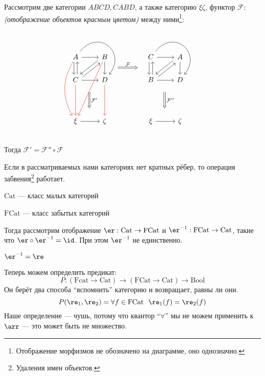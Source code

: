 \begin{example}
    Рассмотрим две категории \(ABCD, CABD\), а также категорию \(\xi\zeta\), функтор \(\mathcal{F} : \) \textit{(отображение объектов красным цветом)} между ними\footnote{Отображение морфизмов не обозначено на диаграмме, оно однозначно.}:
    \[\begin{tikzcd}
            A \arrow[red, bend right]{ddd} \arrow{r}\arrow[shift right]{d}\arrow[bend left = 90, looseness = 2]{rd} & B \arrow[red]{dddl}\arrow[shift right]{dl}\arrow{d} \arrow[Rightarrow, shift right = 6, shorten <= 1em, shorten >= 1em]{rr}{\mathcal{F}} & & C \arrow{r}\arrow[shift right]{d}\arrow[bend left = 90, looseness = 2]{rd} & A \arrow[shift right]{dl}\arrow{d} \\
            C \arrow[red]{dd}\arrow[shift right]{u}\arrow[shift right]{ur} \arrow{r} \arrow[Rightarrow, shift left = 8, shorten <= 1em, shorten >= 1em]{dd}{\mathcal{F}'} & D \arrow[red]{dd} & & B \arrow[shift right]{u}\arrow[shift right]{ur} \arrow{r} \arrow[Rightarrow, shift left = 8, shorten <= 1em, shorten >= 1em]{dd}{\mathcal{F}''} & D  \\
            {} & {} \\
            \xi \arrow{r} & \zeta & & \xi \arrow{r} & \zeta \\
        \end{tikzcd}\]
    Тогда \(\mathcal{F}' = \mathcal{F}'' \circ \mathcal{F}\)
\end{example}

Если в рассматриваемых нами категориях нет кратных рёбер, то операция забвения\footnote{Удаления имен объектов.} работает.

\begin{definition}
    \(\mathrm{Cat}\) --- класс малых категорий

    \(\mathrm{FCat}\) --- класс забытых категорий
\end{definition}

Тогда рассмотрим отображение \(\er : \mathrm{Cat} \to \mathrm{FCat}\) и \(\er^{-1} : \mathrm{FCat} \to \mathrm{Cat}\), такие что \(\er \circ \er^{-1} = \id\). При этом \(\er^{-1}\) не единственно.

\begin{notation}
    \(\er^{-1} = \re\)
\end{notation}
Теперь можем определить предикат:
\[P : (\mathrm{Fcat} \to \mathrm{Cat}) \to (\mathrm{FCat} \to \mathrm{Cat}) \to \mathrm{Bool}\]
Он берёт два способа ``вспомнить'' категорию и возвращает, равны ли они.
\[P (\re_1, \re_2) = \forall f \in \mathrm{FCat} \ \ \re_1(f) = \re_2(f)\]
Наше определение --- чушь, потому что квантор ``\(\forall\)'' мы не можем применить к \(\arr\) --- это может быть не множество.

